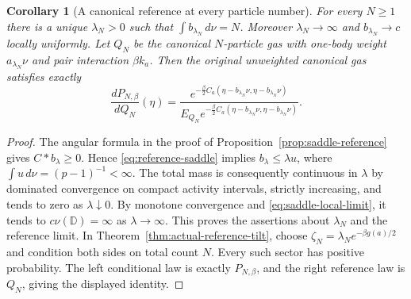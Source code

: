 \documentclass[11pt]{article}
\newtheorem{corollary}[theorem]{Corollary}
\theoremstyle{remark}\newtheorem{remark}[theorem]{Remark}
\begin{document}
\begin{corollary}[A canonical reference at every particle number]
\label{cor:canonical-reference}
For every $N\ge1$ there is a unique $\lambda_N>0$ such that
$\int b_{\lambda_N}\,d\nu=N$.  Moreover $\lambda_N\to\infty$ and
$b_{\lambda_N}\to c$ locally uniformly.  Let $Q_N$ be the canonical
$N$-particle gas with one-body weight $a_{\lambda_N}\nu$ and pair
interaction $\beta k_a$.  Then the original unweighted canonical gas
satisfies exactly
\[
 \frac{dP_{N,\beta}}{dQ_N}(\eta)
 =\frac{e^{-\frac\beta2 C_a(\eta-b_{\lambda_N}\nu,
                              \eta-b_{\lambda_N}\nu)}}
 {E_{Q_N}e^{-\frac\beta2 C_a(\eta-b_{\lambda_N}\nu,
                              \eta-b_{\lambda_N}\nu)}}.
\]
\end{corollary}
\begin{proof}
The angular formula in the proof of
Proposition~\ref{prop:saddle-reference} gives $C*b_\lambda\ge0$.
Hence \eqref{eq:reference-saddle} implies
$b_\lambda\le\lambda u$, where
$\int u\,d\nu=(p-1)^{-1}<\infty$.  The total mass is consequently
continuous in $\lambda$ by dominated convergence on compact activity
intervals, strictly increasing, and tends to zero as $\lambda\downarrow0$.
By monotone convergence and \eqref{eq:saddle-local-limit}, it tends to
$c\nu(\mathbb D)=\infty$ as $\lambda\to\infty$.  This proves the
assertions about $\lambda_N$ and the reference limit.  In
Theorem~\ref{thm:actual-reference-tilt}, choose
$\zeta_N=\lambda_Ne^{-\beta g(a)/2}$ and condition both sides on total
count $N$.  Every such sector has positive probability.  The left
conditional law is exactly $P_{N,\beta}$, and the right reference law
is $Q_N$, giving the displayed identity.
\end{proof}
\end{document}
